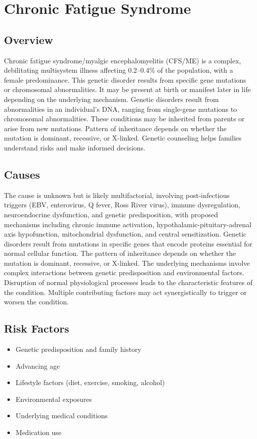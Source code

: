 \chapter{Chronic Fatigue Syndrome}
\label{sec:Chronic Fatigue Syndrome}

\section{Overview}
Chronic fatigue syndrome/myalgic encephalomyelitis (CFS/ME) is a complex, debilitating multisystem illness affecting 0.2--0.4\% of the population, with a female predominance. This genetic disorder results from specific gene mutations or chromosomal abnormalities. It may be present at birth or manifest later in life depending on the underlying mechanism. Genetic disorders result from abnormalities in an individual's DNA, ranging from single-gene mutations to chromosomal abnormalities. These conditions may be inherited from parents or arise from new mutations. Pattern of inheritance depends on whether the mutation is dominant, recessive, or X-linked. Genetic counseling helps families understand risks and make informed decisions.
\section{Causes}
The cause is unknown but is likely multifactorial, involving post-infectious triggers (EBV, enterovirus, Q fever, Ross River virus), immune dysregulation, neuroendocrine dysfunction, and genetic predisposition, with proposed mechanisms including chronic immune activation, hypothalamic-pituitary-adrenal axis hypofunction, mitochondrial dysfunction, and central sensitization. Genetic disorders result from mutations in specific genes that encode proteins essential for normal cellular function. The pattern of inheritance depends on whether the mutation is dominant, recessive, or X-linked. The underlying mechanisms involve complex interactions between genetic predisposition and environmental factors. Disruption of normal physiological processes leads to the characteristic features of the condition. Multiple contributing factors may act synergistically to trigger or worsen the condition.
\section{Risk Factors}


\begin{itemize}[noitemsep]
  \item Genetic predisposition and family history
  \item Advancing age
  \item Lifestyle factors (diet, exercise, smoking, alcohol)
  \item Environmental exposures
  \item Underlying medical conditions
  \item Medication use
\end{itemize}
